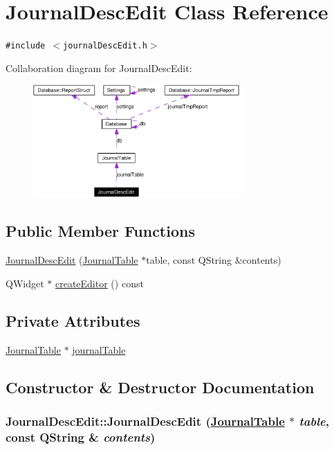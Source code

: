 \hypertarget{classJournalDescEdit}{
\section{Journal\-Desc\-Edit Class Reference}
\label{classJournalDescEdit}
}
{\tt \#include $<$journal\-Desc\-Edit.h$>$}

Collaboration diagram for Journal\-Desc\-Edit:\begin{figure}[H]
\begin{center}
\leavevmode
\includegraphics[width=228pt]{classJournalDescEdit__coll__graph}
\end{center}
\end{figure}
\subsection*{Public Member Functions}
\begin{CompactItemize}
\item 
\hyperlink{classJournalDescEdit_a0}{Journal\-Desc\-Edit} (\hyperlink{classJournalTable}{Journal\-Table} $\ast$table, const QString \&contents)
\item 
QWidget $\ast$ \hyperlink{classJournalDescEdit_a1}{create\-Editor} () const
\end{CompactItemize}
\subsection*{Private Attributes}
\begin{CompactItemize}
\item 
\hyperlink{classJournalTable}{Journal\-Table} $\ast$ \hyperlink{classJournalDescEdit_r0}{journal\-Table}
\end{CompactItemize}


\subsection{Constructor \& Destructor Documentation}
\hypertarget{classJournalDescEdit_a0}{
\subsubsection[JournalDescEdit]{\setlength{\rightskip}{0pt plus 5cm}Journal\-Desc\-Edit::Journal\-Desc\-Edit (\hyperlink{classJournalTable}{Journal\-Table} $\ast$ {\em table}, const QString \& {\em contents})}}
\label{classJournalDescEdit_a0}


